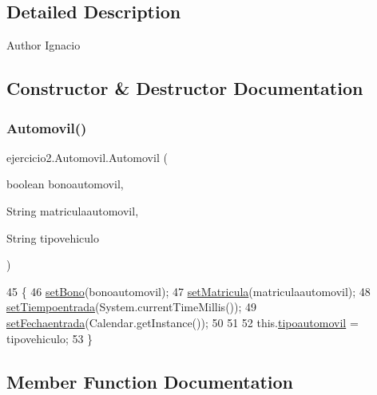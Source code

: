 \subsection{Detailed Description}
\begin{DoxyAuthor}{Author}
Ignacio 
\end{DoxyAuthor}


\subsection{Constructor \& Destructor Documentation}
\mbox{\label{classejercicio2_1_1_automovil_a1c64742023c8ee6815e94cc34dde45aa}} 
\subsubsection{\texorpdfstring{Automovil()}{Automovil()}}
{\footnotesize\ttfamily ejercicio2.\+Automovil.\+Automovil (\begin{DoxyParamCaption}\item[{boolean}]{bonoautomovil,  }\item[{String}]{matriculaautomovil,  }\item[{String}]{tipovehiculo }\end{DoxyParamCaption})\hspace{0.3cm}{\ttfamily [inline]}}


\begin{DoxyCode}
45                                                                                            \{
46         \mbox{\hyperlink{classejercicio2_1_1_vehiculo_a10083fde68a5b3ef8698c76adba64ad7}{setBono}}(bonoautomovil);
47         \mbox{\hyperlink{classejercicio2_1_1_vehiculo_a839f602fe4695d9cb8d085bab398acd5}{setMatricula}}(matriculaautomovil);
48         \mbox{\hyperlink{classejercicio2_1_1_vehiculo_a021e05ca70b02df5ff40d48692beb6ba}{setTiempoentrada}}(System.currentTimeMillis());
49         \mbox{\hyperlink{classejercicio2_1_1_vehiculo_af87ce3fcfad1f20eb2fdbb87caaf6576}{setFechaentrada}}(Calendar.getInstance());
50         
51         
52         this.\mbox{\hyperlink{classejercicio2_1_1_automovil_a64abc2717187d18de8f7ef8a86c4b025}{tipoautomovil}} = tipovehiculo;
53     \}
\end{DoxyCode}


\subsection{Member Function Documentation}
\mbox{\label{classejercicio2_1_1_automovil_a7b5c83321312bfd2e91c6acbbc2c6088}} 
